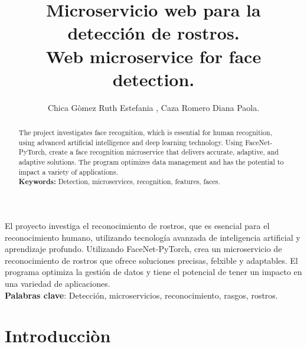 \documentclass[12pt]{article}
\title{Microservicio web para la detección de rostros.\\Web microservice for face detection.}
\author{Chica Gòmez Ruth Estefania , Caza Romero Diana Paola.
}
\begin{document}
 

\maketitle

\begin{resumo} 
  El proyecto investiga el reconocimiento de rostros, que es esencial para el reconocimiento humano, utilizando tecnología avanzada de inteligencia artificial y aprendizaje profundo. Utilizando FaceNet-PyTorch, crea un microservicio de reconocimiento de rostros que ofrece soluciones precisas, felxible y adaptables. El programa optimiza la gestión de datos y tiene el potencial de tener un impacto en una variedad de aplicaciones.\\
  \textbf{Palabras clave}: Detección, microservicios, reconocimiento, rasgos, rostros.
\end{resumo}
\begin{abstract}
  The project investigates face recognition, which is essential for human recognition, using advanced artificial intelligence and deep learning technology. Using FaceNet-PyTorch, create a face recognition microservice that delivers accurate, adaptive, and adaptive solutions. The program optimizes data management and has the potential to impact a variety of applications.\\
  \textbf{Keywords:} Detection, microservices, recognition, features, faces.
\end{abstract}

\section{Introducciòn}
\end{document}
